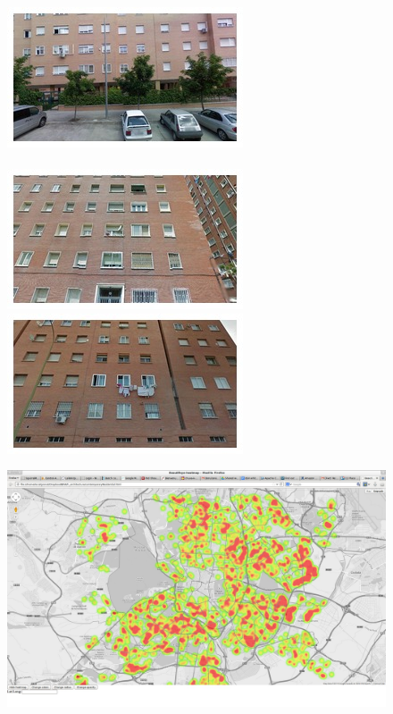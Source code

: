 \begin{figure}[t]
\begin{minipage}{\linewidth}
\begin{minipage}{0.3\linewidth}
      \includegraphics[width=0.49\linewidth]{imgs/arch/mosaicsS3/mosaic0007.jpg}
      \\ \vspace{-3mm} \\
      \includegraphics[width=0.49\linewidth]{imgs/arch/mosaicsS3/mosaic0008.jpg}
      \includegraphics[width=0.49\linewidth]{imgs/arch/mosaicsS3/mosaic0009.jpg}
    \end{minipage}
    \begin{minipage}{0.7\linewidth}
      \includegraphics[trim= 350 150 250 150, clip=true, width=\linewidth]{imgs/arch/mapS3.jpg}

\end{minipage}
\end{minipage}
\end{figure}
